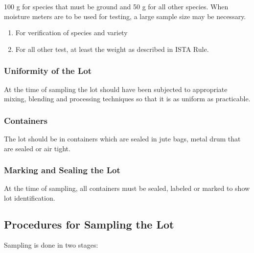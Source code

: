 \documentclass[
]{book}
\begin{document}
100 g for species that must be ground and 50 g for all other species. When moisture meters are to be used for testing, a large sample size may be necessary.

\begin{enumerate}
\def\labelenumi{\alph{enumi})}
\setcounter{enumi}{1}
\item
  For verification of species and variety
\item
  For all other test, at least the weight as described in ISTA Rule.
\end{enumerate}

\hypertarget{uniformity-of-the-lot}{%
\subsubsection{Uniformity of the Lot}\label{uniformity-of-the-lot}}

At the time of sampling the lot should have been subjected to appropriate mixing, blending and processing techniques so that it is as uniform as practicable.

\hypertarget{containers}{%
\subsubsection{Containers}\label{containers}}

The lot should be in containers which are sealed in jute bags, metal drum that are sealed or air tight.

\hypertarget{marking-and-sealing-the-lot}{%
\subsubsection{Marking and Sealing the Lot}\label{marking-and-sealing-the-lot}}

At the time of sampling, all containers must be sealed, labeled or marked to show lot identification.

\hypertarget{procedures-for-sampling-the-lot}{%
\subsection{Procedures for Sampling the Lot}\label{procedures-for-sampling-the-lot}}

Sampling is done in two stages:
\end{document}

